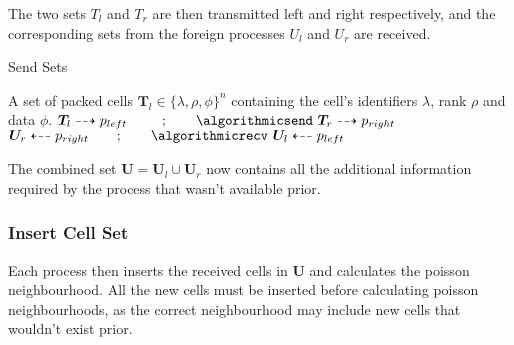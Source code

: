 \documentclass[twoside]{IIBproject}
\newcommand{\vect} [1] {\bm{#1}}
\newcommand{\dra}{\dashrightarrow}
\newcommand{\dla}{\dashleftarrow}
\numberwithin{figure}{section}
\begin{document}
            The two sets $T_l$ and $T_r$ are then transmitted left and right respectively, and the corresponding sets from the foreign processes $U_l$ and $U_r$ are received.

            \begin{algorithm}[!htbp]
                \caption{Send Sets}
                \label{alg:rebalance-sendsets}

                \begin{algorithmic}
                    \Require A set of packed cells $\vect{T}_l \in \{\lambda, \rho, \phi\}^n$ containing the cell's identifiers $\lambda$, rank $\rho$ and data $\phi$.
                    \Statex
                    \Send $\vect{T}_l \dra p_{left} \qquad\ \,;\qquad \algorithmicsend\ \vect{T}_r \dra p_{right}$
                    \Recv $\vect{U}_r \dla p_{right} \qquad;\qquad \algorithmicrecv\ \vect{U}_l \dla p_{left}$
                \end{algorithmic}
            \end{algorithm}

            The combined set $\vect{U}=\vect{U}_l\cup\vect{U}_r$ now contains all the additional information required by the process that wasn't available prior.



        \subsubsection{Insert Cell Set} %
            \label{sec:rebalancing-insertcells}

            Each process then inserts the received cells in $\vect{U}$ and calculates the poisson neighbourhood. All the new cells must be inserted before calculating poisson neighbourhoods, as the correct neighbourhood may include new cells that wouldn't exist prior.
\end{document}
